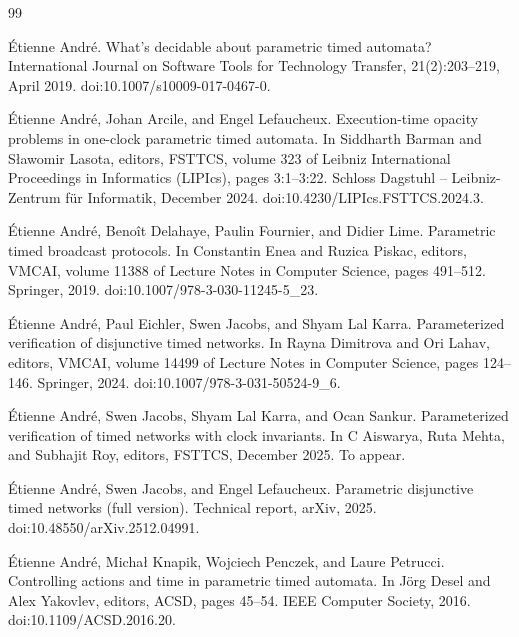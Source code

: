 \documentclass[10pt,a4paper]{article}
\begin{document}
\begin{thebibliography}{99}
\par\noindent    Étienne André.  What’s decidable about parametric timed automata?  International Journal on Software Tools for Technology Transfer, 21(2):203--219, April 2019.  doi:10.1007/s10009-017-0467-0.  

\par\noindent    Étienne André, Johan Arcile, and Engel Lefaucheux.  Execution-time opacity problems in one-clock parametric timed automata.  In Siddharth Barman and Sławomir Lasota, editors, FSTTCS, volume 323 of Leibniz International Proceedings in Informatics (LIPIcs), pages 3:1--3:22. Schloss Dagstuhl -- Leibniz-Zentrum für Informatik, December 2024.  doi:10.4230/LIPIcs.FSTTCS.2024.3.  

\par\noindent    Étienne André, Benoît Delahaye, Paulin Fournier, and Didier Lime.  Parametric timed broadcast protocols.  In Constantin Enea and Ruzica Piskac, editors, VMCAI, volume 11388 of Lecture Notes in Computer Science, pages 491--512. Springer, 2019.  doi:10.1007/978-3-030-11245-5\_23.  

\par\noindent    Étienne André, Paul Eichler, Swen Jacobs, and Shyam Lal Karra.  Parameterized verification of disjunctive timed networks.  In Rayna Dimitrova and Ori Lahav, editors, VMCAI, volume 14499 of Lecture Notes in Computer Science, pages 124--146. Springer, 2024.  doi:10.1007/978-3-031-50524-9\_6.  

\par\noindent    Étienne André, Swen Jacobs, Shyam Lal Karra, and Ocan Sankur.  Parameterized verification of timed networks with clock invariants.  In C Aiswarya, Ruta Mehta, and Subhajit Roy, editors, FSTTCS, December 2025.  To appear.  

\par\noindent    Étienne André, Swen Jacobs, and Engel Lefaucheux.  Parametric disjunctive timed networks (full version).  Technical report, arXiv, 2025.  doi:10.48550/arXiv.2512.04991.  

\par\noindent    Étienne André, Michał Knapik, Wojciech Penczek, and Laure Petrucci.  Controlling actions and time in parametric timed automata.  In Jörg Desel and Alex Yakovlev, editors, ACSD, pages 45--54. IEEE Computer Society, 2016.  doi:10.1109/ACSD.2016.20.  


\end{thebibliography}
\end{document}

